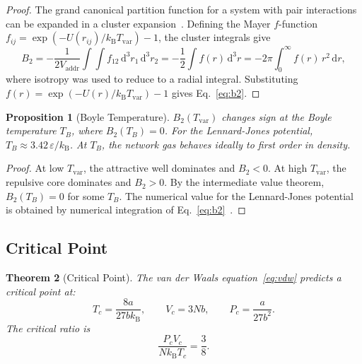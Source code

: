 \documentclass[11pt,twocolumn,a4paper]{article}
\newtheorem{theorem}{Theorem}[section]
\newtheorem{proposition}[theorem]{Proposition}
\theoremstyle{definition}
\theoremstyle{remark}
\newcommand{\kB}{k_{\mathrm{B}}}
\newcommand{\Tvar}{T_{\mathrm{var}}}
\newcommand{\Vaddr}{V_{\mathrm{addr}}}
\newcommand{\dd}{\mathrm{d}}
\begin{document}
\begin{proof}
The grand canonical partition function for a system with pair interactions
can be expanded in a cluster expansion~\cite{Pathria2011,Huang1987}.
Defining the Mayer $f$-function $f_{ij}=\exp(-U(r_{ij})/\kB\Tvar)-1$,
the cluster integrals give
\[
  B_2 = -\frac{1}{2\Vaddr}\int\int f_{12}\,\dd^3 r_1\,\dd^3 r_2
  = -\frac{1}{2}\int f(r)\,\dd^3 r
  = -2\pi\int_0^{\infty}f(r)\,r^2\,\dd r,
\]
where isotropy was used to reduce to a radial integral.  Substituting
$f(r)=\exp(-U(r)/\kB\Tvar)-1$ gives Eq.~\eqref{eq:b2}.
\end{proof}

\begin{proposition}[Boyle Temperature]\label{prop:boyle}
$B_2(\Tvar)$ changes sign at the Boyle temperature $T_B$, where
$B_2(T_B)=0$.  For the Lennard-Jones potential, $T_B\approx 3.42\,
\varepsilon/\kB$.  At $T_B$, the network gas behaves ideally to first
order in density.
\end{proposition}

\begin{proof}
At low $\Tvar$, the attractive well dominates and $B_2<0$.  At high
$\Tvar$, the repulsive core dominates and $B_2>0$.  By the intermediate
value theorem, $B_2(T_B)=0$ for some $T_B$.  The numerical value for the
Lennard-Jones potential is obtained by numerical integration of
Eq.~\eqref{eq:b2}~\cite{Pathria2011}.
\end{proof}

\subsection{Critical Point}\label{sec:critical}

\begin{theorem}[Critical Point]\label{thm:critical}
The van der Waals equation~\eqref{eq:vdw} predicts a critical point at:
\begin{equation}\label{eq:critical}
  T_c = \frac{8a}{27b\kB},\qquad
  V_c = 3Nb,\qquad
  P_c = \frac{a}{27b^2}.
\end{equation}
The critical ratio is
\begin{equation}\label{eq:critical_ratio}
  \frac{P_c V_c}{N\kB T_c} = \frac{3}{8}.
\end{equation}
\end{theorem}
\end{document}
